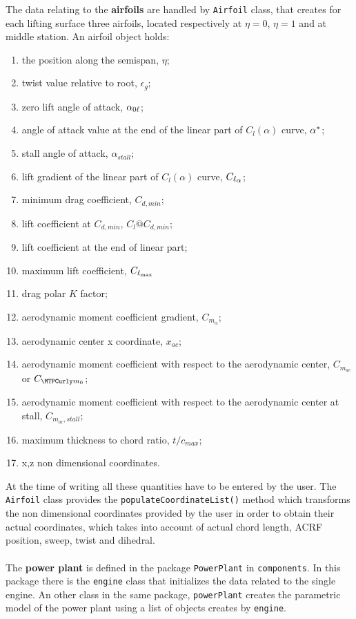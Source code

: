 The data relating to the {\bfseries airfoils} are handled by \texttt{Airfoil} class, that creates for each lifting surface three airfoils, located respectively at $\eta=0$, $\eta=1$ and at middle station. An airfoil object holds:
\begin{enumerate}
	\item the position along the semispan, $\eta$;
	\item twist value relative to root, $\epsilon_g$;
	\item zero lift angle of attack, $\alpha_{{0\ell}}$;
	\item angle of attack value at the end of the linear part of $C_l(\alpha)$ curve, $\alpha^*$;
	\item stall angle of attack, $\alpha_{stall}$;
	\item lift gradient of the linear part of $C_l(\alpha)$ curve, $\Clalphap$;
	\item minimum drag coefficient, $C_{d,min}$;
	\item lift coefficient at $C_{d,min}$, $C_l@C_{d,min}$;
	\item lift coefficient at the end of linear part;
	\item maximum lift coefficient, $C_{\ell_{\text{max}}}$
	\item drag polar $K$ factor;
	\item aerodynamic moment coefficient gradient, $C_{m_\alpha}$;
	\item aerodynamic center x coordinate, $x_{ac}$;
	\item aerodynamic moment coefficient with respect to the aerodynamic center, $C_{m_{ac}}$ or $\Cmzerop$;
	\item aerodynamic moment coefficient with respect to the aerodynamic center at stall, $C_{m_{ac},stall}$;
	\item maximum thickness to chord ratio, $t/c_{max}$;
	\item x,z non dimensional coordinates.
\end{enumerate}
At the time of writing all these quantities have to be entered by the user. The \texttt{Airfoil} class provides the \texttt{populateCoordinateList()} method which transforms the non dimensional coordinates provided by the user in order to obtain their actual coordinates, which takes into account of actual chord length, ACRF position, sweep, twist and dihedral.\\ \\

The  {\bfseries power plant} is defined in the package \texttt{PowerPlant} in \texttt{components}. In this package there is the \texttt{engine} class that initializes the data related to the single engine. An other class in the same package, \texttt{powerPlant} creates the parametric model of the power plant using a list of objects creates by \texttt{engine}.


